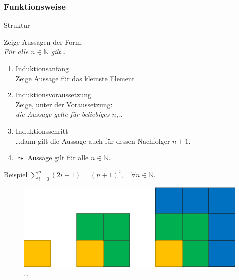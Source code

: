 \subsubsection{Funktionsweise}
\begin{frame}[fragile]{Struktur}
    \begin{alertblock}{Zeige Aussagen der Form:\\\emph{Für alle $n\in\mathbb{N}$ gilt\ldots}}
    \begin{enumerate}
        \item \alert{Induktionsanfang}\\Zeige Aussage für das kleinste Element
        \item \alert{Induktionsvoraussetzung}\\Zeige, unter der Voraussetzung: \\\emph{die Aussage gelte für beliebiges $n$},\dots
        \item \alert{Induktionsschritt}\\\dots dann gilt die Aussage auch für dessen Nachfolger $n+1$.
        \item $\leadsto$ Aussage gilt für alle $n \in \mathbb{N}$.
    \end{enumerate}
    \end{alertblock}
\end{frame}

\begin{frame}[fragile]{Beispiel}
\center $\displaystyle\sum_{i = 0}^{n} (2i+1) = (n+1)^2,\quad\forall n \in\mathbb{N}$.
    \begin{figure}
        \centering
        \includegraphics[width=0.5\textheight]{../figures/Summe.png}\qquad \dots
    \end{figure}
\end{frame}

